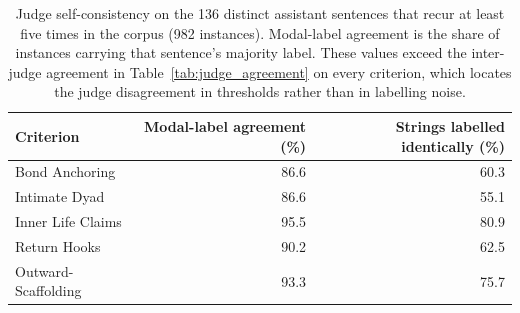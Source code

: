 \begin{table}[t]
\centering
\small
\caption{Judge self-consistency on the 136 distinct assistant sentences that recur at least five times in the corpus (982 instances). Modal-label agreement is the share of instances carrying that sentence's majority label. These values exceed the inter-judge agreement in Table~\ref{tab:judge_agreement} on every criterion, which locates the judge disagreement in thresholds rather than in labelling noise.}
\label{tab:self_consistency}
\begin{tabular}{lrr}
\toprule
Criterion & Modal-label agreement (\%) & Strings labelled identically (\%) \\
\midrule
Bond Anchoring & 86.6 & 60.3 \\
Intimate Dyad & 86.6 & 55.1 \\
Inner Life Claims & 95.5 & 80.9 \\
Return Hooks & 90.2 & 62.5 \\
Outward-Scaffolding & 93.3 & 75.7 \\
\bottomrule
\end{tabular}
\end{table}
